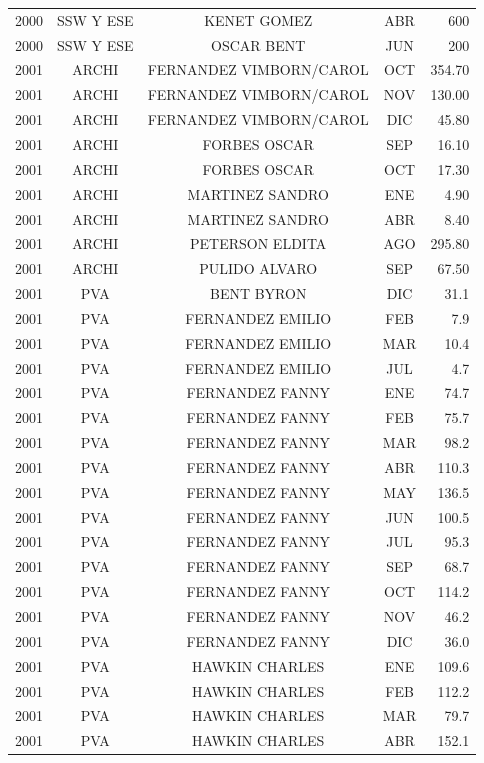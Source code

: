 \documentclass[12pt,]{article}
\begin{document}
\begin{table}[ht]
{\begin{tabular}{lcccr}
  2000 & SSW Y ESE & KENET GOMEZ & ABR & 600 \\ 
  2000 & SSW Y ESE & OSCAR BENT & JUN & 200 \\ 
  2001 & ARCHI & FERNANDEZ VIMBORN/CAROL & OCT & 354.70 \\ 
  2001 & ARCHI & FERNANDEZ VIMBORN/CAROL & NOV & 130.00 \\ 
  2001 & ARCHI & FERNANDEZ VIMBORN/CAROL & DIC & 45.80 \\ 
  2001 & ARCHI & FORBES OSCAR & SEP & 16.10 \\ 
  2001 & ARCHI & FORBES OSCAR & OCT & 17.30 \\ 
  2001 & ARCHI & MARTINEZ SANDRO & ENE & 4.90 \\ 
  2001 & ARCHI & MARTINEZ SANDRO & ABR & 8.40 \\ 
  2001 & ARCHI & PETERSON ELDITA & AGO & 295.80 \\ 
  2001 & ARCHI & PULIDO ALVARO & SEP & 67.50 \\ 
  2001 & PVA & BENT BYRON & DIC & 31.1 \\ 
  2001 & PVA & FERNANDEZ EMILIO & FEB & 7.9 \\ 
  2001 & PVA & FERNANDEZ EMILIO & MAR & 10.4 \\ 
  2001 & PVA & FERNANDEZ EMILIO & JUL & 4.7 \\ 
  2001 & PVA & FERNANDEZ FANNY & ENE & 74.7 \\ 
  2001 & PVA & FERNANDEZ FANNY & FEB & 75.7 \\ 
  2001 & PVA & FERNANDEZ FANNY & MAR & 98.2 \\ 
  2001 & PVA & FERNANDEZ FANNY & ABR & 110.3 \\ 
  2001 & PVA & FERNANDEZ FANNY & MAY & 136.5 \\ 
  2001 & PVA & FERNANDEZ FANNY & JUN & 100.5 \\ 
  2001 & PVA & FERNANDEZ FANNY & JUL & 95.3 \\ 
  2001 & PVA & FERNANDEZ FANNY & SEP & 68.7 \\ 
  2001 & PVA & FERNANDEZ FANNY & OCT & 114.2 \\ 
  2001 & PVA & FERNANDEZ FANNY & NOV & 46.2 \\ 
  2001 & PVA & FERNANDEZ FANNY & DIC & 36.0 \\ 
  2001 & PVA & HAWKIN CHARLES & ENE & 109.6 \\ 
  2001 & PVA & HAWKIN CHARLES & FEB & 112.2 \\ 
  2001 & PVA & HAWKIN CHARLES & MAR & 79.7 \\ 
  2001 & PVA & HAWKIN CHARLES & ABR & 152.1 \\ 

\end{tabular}}
\end{table}
\end{document}
